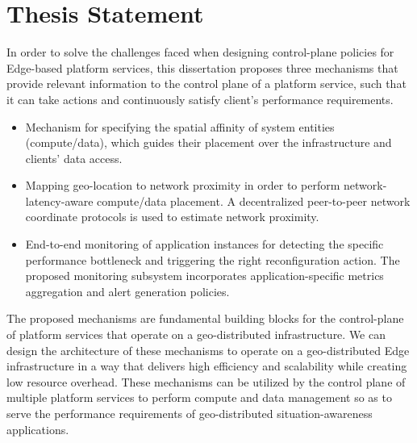 \section{Thesis Statement}
In order to solve the challenges faced when designing control-plane policies for Edge-based platform services, this dissertation proposes three mechanisms that provide relevant information to the control plane of a platform service, such that it can take actions and continuously satisfy client's performance requirements.
\begin{itemize}
\item Mechanism for specifying the spatial affinity of system entities (compute/data), which guides their placement over the infrastructure and clients' data access. 
\item Mapping geo-location to network proximity in order to perform network-latency-aware compute/data placement. A decentralized peer-to-peer network coordinate protocols is used to estimate network proximity.
\item End-to-end monitoring of application instances for detecting the specific performance bottleneck and triggering the right reconfiguration action. The proposed monitoring subsystem incorporates application-specific metrics aggregation and alert generation policies. 
\end{itemize}

The proposed mechanisms are fundamental building blocks for the control-plane of platform services that operate on a geo-distributed infrastructure. We can design the architecture of these mechanisms to operate on a geo-distributed Edge infrastructure in a way that delivers high efficiency and scalability while creating low resource overhead. These mechanisms can be utilized by the control plane of multiple platform services to perform compute and data management so as to serve the performance requirements of geo-distributed situation-awareness applications. 


